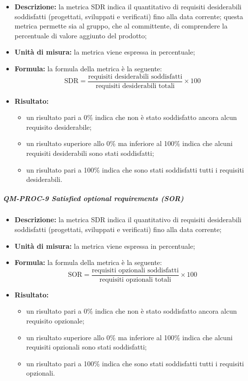 			\begin{itemize}
      			\item \textbf{Descrizione: }
				la metrica SDR indica il quantitativo di requisiti desiderabili soddisfatti (progettati, sviluppati e verificati) fino alla data corrente; questa metrica permette sia al gruppo, che al committente, di comprendere la percentuale di valore aggiunto del prodotto;

				\item \textbf{Unità di misura: }
				la metrica viene espressa in percentuale;

				\item \textbf{Formula: }
				la formula della metrica è la seguente:
				\[
					\text{SDR} = \frac{\text{requisiti desiderabili soddisfatti}}{\text{requisiti desiderabili totali}} \times 100
				\]

				\item \textbf{Risultato: }
				\begin{itemize}
					\item un risultato pari a 0\% indica che non è stato soddisfatto ancora alcun requisito desiderabile;
					\item un risultato superiore allo 0\% ma inferiore al 100\% indica che alcuni requisiti desiderabili sono stati soddisfatti;
					\item un risultato pari a 100\% indica che sono stati soddisfatti tutti i requisiti desiderabili.
				\end{itemize}
			\end{itemize}

			\subparagraph{QM-PROC-9 Satisfied optional requirements (SOR)}

			\begin{itemize}
      			\item \textbf{Descrizione: }
				la metrica SDR indica il quantitativo di requisiti desiderabili soddisfatti (progettati, sviluppati e verificati) fino alla data corrente;

				\item \textbf{Unità di misura: }
				la metrica viene espressa in percentuale;

				\item \textbf{Formula: }
				la formula della metrica è la seguente:
				\[
					\text{SOR} = \frac{\text{requisiti opzionali soddisfatti}}{\text{requisiti opzionali totali}} \times 100
				\]

				\item \textbf{Risultato: }
				\begin{itemize}
					\item un risultato pari a 0\% indica che non è stato soddisfatto ancora alcun requisito opzionale;
					\item un risultato superiore allo 0\% ma inferiore al 100\% indica che alcuni requisiti opzionali sono stati soddisfatti;
					\item un risultato pari a 100\% indica che sono stati soddisfatti tutti i requisiti opzionali.
				\end{itemize}
			\end{itemize}

